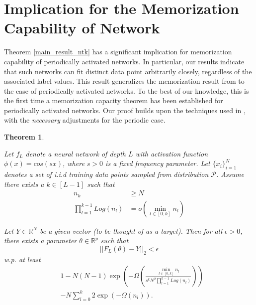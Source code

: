 \documentclass{article}
\theoremstyle{plain}
\newtheorem{Theorem}{Theorem}[section]
\theoremstyle{definition}
\theoremstyle{remark}
\newcommand\R{\mathbb{R}}
\begin{document}
\section{Implication for the Memorization Capability of Network}\label{sec_mem}
Theorem \ref{main_result_ntk} has a significant implication for memorization capability of periodically activated networks. In particular, our results indicate that such networks can fit distinct data point arbitrarily closely, regardless of the associated label values. This result generalizes the memorization result from 
\cite{nguyen2021tight} to the case of periodically activated networks. To the best of our knowledge, this is the first time a memorization capacity theorem has been established for periodically activated networks.
Our proof builds upon the techniques used in \cite{nguyen2021tight}, with the \textit{necessary} adjustments for the periodic case.

\begin{Theorem}\label{mem_cos}

Let $f_L$ denote a neural network of depth $L$ with activation function $\phi(x) = cos(sx)$, where $s > 0$ is a fixed frequency parameter. 
Let $\{x_i\}_{i=1}^N$ denotes a set of i.i.d training data points sampled from distribution $\mathcal{P}$. Assume there exists a $k \in [L-1]$ such that 
\begin{align*}
    n_k &\geq N \\
    \prod_{l=1}^{k-1}Log(n_l) &= o(\min_{l \in [0,k]}n_l)
\end{align*}

Let $Y \in \R^N$ be a given vector (to be thought of as a target). Then for all $\epsilon > 0$, there exists
a parameter $\theta \in \R^p$ such that
\begin{equation*}
    \vert\vert F_L(\theta) - Y\vert\vert_2 < \epsilon
\end{equation*}
w.p. at least 
\begin{align*}
    & 1 - N(N-1)\exp\left(-
\Omega\left(
\frac{\min_{l \in [0,k]}n_l}{s^kN^2\prod_{l=1}^{k-1}Log(n_l)}
\right)
\right) \\
&- N\sum_{l=0}^k2\exp(-\Omega(n_l)).
\end{align*}
\end{Theorem}
\end{document}
